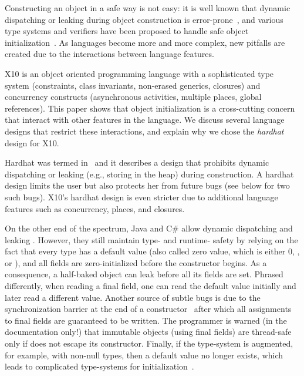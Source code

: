 Constructing an object in a safe way is not easy:
    it is well known that dynamic dispatching
    or leaking \this during object construction
    is error-prone~\cite{Dean:1996,Seo:2007:SBD:1522565.1522587,Gil:2009:WRS:1615184.1615216},
    and various type systems and verifiers have been proposed to
    handle safe object initialization~\cite{Hubert:2010:ESO:1888881.1888890,Zibin:2010:OIG:1869459.1869509,Fahndrich:2007:EOI:1297027.1297052,XinQi:2009}.
As languages become more and more complex,
    new pitfalls are created due to the interactions between
    language features.

X10 is an object oriented programming language with a sophisticated
    type system (constraints, class invariants, non-erased generics, closures)
    and concurrency constructs (asynchronous activities, multiple places, global references).
This paper shows that object initialization is a cross-cutting concern
    that interact with other features in the language.
We discuss several language designs that restrict these interactions,
    and explain why we chose the \emph{hardhat} design for X10.

{Hardhat} was termed in~\cite{Gil:2009:WRS:1615184.1615216}
    and it describes a design that prohibits dynamic dispatching
    or leaking \this (e.g., storing \this in the heap) during construction.
A hardhat design limits the user
    but also protects her from future bugs
    (see  below for two such bugs).
X10's hardhat design is even stricter due to additional language features
    such as concurrency, places, and closures.

On the other end of the spectrum,
    Java and C\# allow
    dynamic dispatching and leaking \this.
However, they still maintain type- and runtime- safety
    by relying on the fact that every type has a default value
    (also called zero value, which is either 0, , or ),
    and all fields are zero-initialized before the constructor begins.
As a consequence,
    a half-baked object can leak before all its fields are set. %
Phrased differently,
    when reading a final field, one can read the default value initially and later read a different value.
Another source of subtle bugs is due to the synchronization barrier
    at the end of a constructor~\cite{JSR133}
    after which all assignments to final fields are guaranteed to be written.
The programmer is warned (in the documentation only!)
    that immutable objects (using final fields) are thread-safe only if
    \this does not escape its constructor.
Finally, if the type-system is augmented, for example, with non-null types, then
    a default value no longer exists,
    which leads to complicated type-systems for initialization~\cite{Fahndrich:2007:EOI:1297027.1297052,XinQi:2009}.

